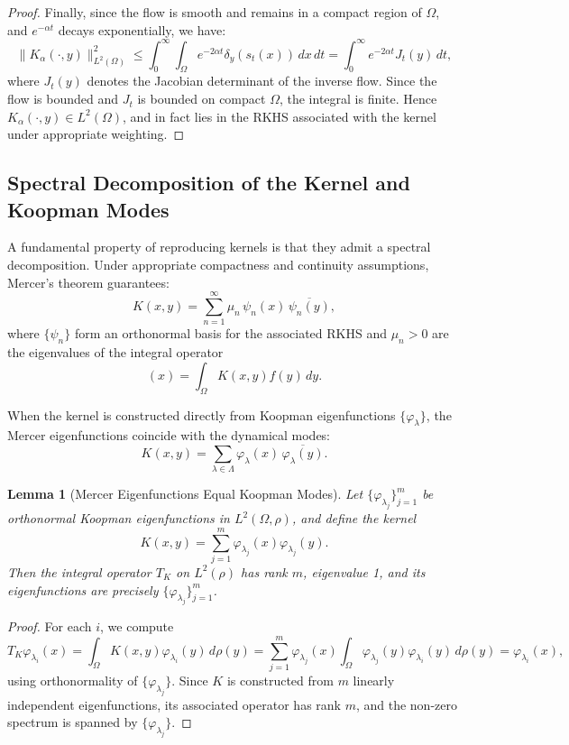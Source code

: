 \documentclass[11pt]{article}
\theoremstyle{plain}
\newtheorem{lemma}[theorem]{Lemma}
\def\[{\begin{equation}}
\def\]{\end{equation}}
\begin{document}
\begin{proof}
\medskip

Finally, since the flow is smooth and remains in a compact region of \( \Omega \), and \( e^{-\alpha t} \) decays exponentially, we have:
\[
\| K_\alpha(\cdot, y) \|_{L^2(\Omega)}^2 \le \int_0^\infty \int_\Omega e^{-2\alpha t} \delta_y(s_t(x)) \, dx \, dt = \int_0^\infty e^{-2\alpha t} J_t(y) \, dt,
\]
where \( J_t(y) \) denotes the Jacobian determinant of the inverse flow. Since the flow is bounded and \( J_t \) is bounded on compact \( \Omega \), the integral is finite. Hence \( K_\alpha(\cdot, y) \in L^2(\Omega) \), and in fact lies in the RKHS associated with the kernel under appropriate weighting.
\end{proof}




\subsection{Spectral Decomposition of the Kernel and Koopman Modes}

A fundamental property of reproducing kernels is that they admit a spectral decomposition. Under appropriate compactness and continuity assumptions, Mercer’s theorem guarantees:
\[
K(x,y) = \sum_{n=1}^{\infty} \mu_n\,\psi_n(x)\,\overline{\psi_n(y)},
\]
where \(\{\psi_n\}\) form an orthonormal basis for the associated RKHS and \(\mu_n>0\) are the eigenvalues of the integral operator
\[
[T_K f](x) = \int_{\Omega} K(x,y) f(y)\,dy.
\]

When the kernel is constructed directly from Koopman eigenfunctions \(\{\varphi_\lambda\}\), the Mercer eigenfunctions coincide with the dynamical modes:
\[
K(x,y) = \sum_{\lambda\in\Lambda} \varphi_\lambda(x)\,\overline{\varphi_\lambda(y)}.
\]

\begin{lemma}[Mercer Eigenfunctions Equal Koopman Modes]
\label{lem:MercerKoopman}
Let \(\{\varphi_{\lambda_j}\}_{j=1}^{m}\) be orthonormal Koopman eigenfunctions in \(L^2(\Omega, \rho)\), and define the kernel
\[
K(x, y) = \sum_{j=1}^{m} \varphi_{\lambda_j}(x) \varphi_{\lambda_j}(y).
\]
Then the integral operator \(T_K\) on \(L^2(\rho)\) has rank \(m\), eigenvalue 1, and its eigenfunctions are precisely \(\{\varphi_{\lambda_j}\}_{j=1}^m\).
\end{lemma}

\begin{proof}
For each \(i\), we compute
\[
T_K \varphi_{\lambda_i}(x) = \int_\Omega K(x, y) \varphi_{\lambda_i}(y) \, d\rho(y)
= \sum_{j=1}^m \varphi_{\lambda_j}(x) \int_\Omega \varphi_{\lambda_j}(y) \varphi_{\lambda_i}(y) \, d\rho(y)
= \varphi_{\lambda_i}(x),
\]
using orthonormality of \(\{\varphi_{\lambda_j}\}\). Since \(K\) is constructed from \(m\) linearly independent eigenfunctions, its associated operator has rank \(m\), and the non-zero spectrum is spanned by \(\{\varphi_{\lambda_j}\}\).
\end{proof}
\end{document}
